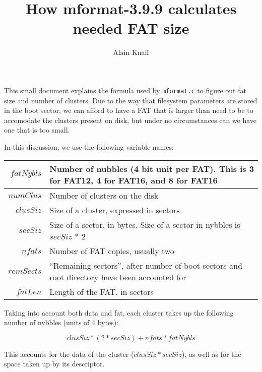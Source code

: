 \documentclass[a4paper,12pt]{article}
\author{Alain Knaff}
\title{How mformat-3.9.9 calculates needed FAT size}
\begin{document}
\maketitle

This small document explains the formula used by {\tt mformat.c} to
figure out fat size and number of clusters. Due to the way that
filesystem parameters are stored in the boot sector, we can afford to
have a FAT that is larger than need to be to accomodate the clusters
present on disk, but under no circumstances can we have one that is
too small.

In this discussion, we use the following variable names:

\begin{tabular}{|r|p{12cm}|}

\hline

$fatNybls$&
Number of nubbles (4 bit unit per FAT). This is 3 for FAT12, 4 for
FAT16, and 8 for FAT16\\

\hline

$numClus$&
Number of clusters on the disk\\

\hline

$clusSiz$&
Size of a cluster, expressed in sectors\\

\hline

$secSiz$&
Size of a sector, in bytes. Size of a sector in nybbles is $secSiz$ * 2\\

\hline

$nfats$&
Number of FAT copies, usually two\\

\hline

$remSects$&
``Remaining sectors'', after number of boot sectors and root directory
have been accounted for\\

\hline

$fatLen$&
Length of the FAT, in sectors\\

\hline


\end{tabular}


Taking into account both data and fat, each cluster takes up the
following number of nybbles (units of 4 bytes):


$$clusSiz * (2*secSiz)  + nfats * fatNybls$$
	
This accounts for the data of the cluster ($clusSiz * secSiz$),
as well as for the space taken up by its descriptor.
\end{document}
